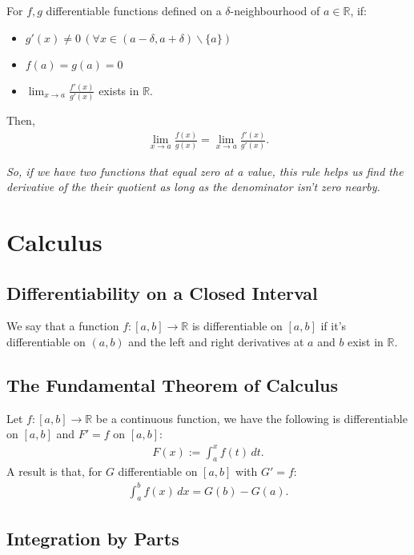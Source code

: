 \documentclass[a4paper, 12pt, twoside]{article}
\begin{document}
For $f, g$ differentiable functions defined on a $\delta$-neighbourhood
of $a \in \mathbb{R}$, if:

\begin{itemize}
      \item $g'(x) \neq 0 \, (\forall x \in
                  (a - \delta, a + \delta)\backslash\{a\})$
      \item $f(a) = g(a) = 0$
      \item $\lim_{x\to a}\frac{f'(x)}{g'(x)}$ exists in $\mathbb{R}$.
\end{itemize}

Then,
\begin{align*}
      \lim_{x\to a}\frac{f(x)}{g(x)} = \lim_{x\to a}\frac{f'(x)}{g'(x)}.
\end{align*}

\textit{So, if we have two functions that equal zero at a value, this
      rule helps us find the derivative of the their quotient as long
      as the denominator isn't zero nearby.}

\section{Calculus}

\subsection{Differentiability on a Closed Interval}

We say that a function $f:[a, b] \to \mathbb{R}$ is differentiable on $[a, b]$
if it's differentiable on $(a, b)$ and the left and right derivatives at $a$
and $b$ exist in $\mathbb{R}$.

\subsection{The Fundamental Theorem of Calculus}

Let $f:[a, b] \to \mathbb{R}$ be a continuous function, we have the following
is differentiable on $[a, b]$ and $F' = f$ on $[a, b]$:
\begin{align*}
      F(x) := \int_a^x f(t) \, dt.
\end{align*}
A result is that, for $G$ differentiable on $[a, b]$ with $G' = f$:
\begin{align*}
      \int_a^b f(x) \, dx = G(b) - G(a).
\end{align*}

\subsection{Integration by Parts}
\end{document}
